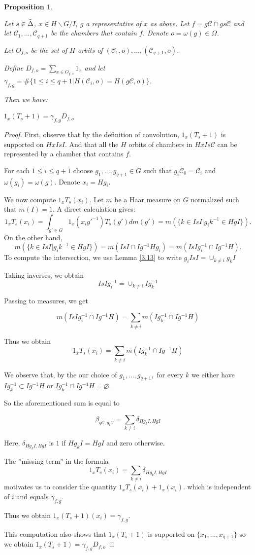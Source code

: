 \documentclass[10pt,a4paper]{amsart}
\newtheorem{prop}{Proposition}
\newcommand{\C}{\mathcal{C}}
\renewcommand{\emptyset}{\varnothing}
\begin{document}
\begin{prop}\label{key_computation}

Let $s\in \Tilde{\Delta}$, $x\in H\backslash G/I$, $g$ a representative of $x$ as above. Let $f=g\C\cap gs\C$ and let $\C_1,...,\C_{q+1}$ be the chambers that contain $f$. Denote $o=\omega(g)\in\Omega$.

Let $O_{f,o}$ be the set of $H$ orbits of $(\C_1,o),...,(\C_{q+1},o)$.

Define $D_{f,o}=\sum_{x\in O_{f,o}}1_x$ and 
let $\gamma_{f,g}=\#\{1\leq i\leq q+1|H(\C_i,o)=H(g\C,o)\}$.

Then we have:
\begin{center}
    $1_x(T_s+1)=\gamma_{f,g} D_{f,o}$
\end{center}
\end{prop}

\begin{proof}

First, observe that by the definition of convolution, $1_x(T_s+1)$ is supported on $HxIsI$. And that all the $H$ orbits of chambers in $HxIs\C$ can be represented by a chamber that contains $f$.

For each $1\leq i\leq q+1$ choose $g_1,...,g_{q+1}\in G$ such that $g_i\C_0=\C_i$ and $\omega(g_i)=\omega(g)$. Denote $x_i=Hg_i$.

We now compute $1_{x}T_s(x_i)$.
Let $m$ be a Haar measure on $G$ normalized such that $m(I)=1.$
A direct calculation gives:
$$1_{x}T_s(x_i)=\int_{g'\in G} 1_{x}(x_ig'^{-1})T_s(g')dm(g')=m(\{k\in IsI|g_ik^{-1}\in HgI\}).$$ 
On the other hand, 
$$m(\{k\in IsI|g_ik^{-1}\in HgI\})=m(IsI\cap Ig^{-1}Hg_i)=m(IsIg^{-1}_i\cap Ig^{-1}H).$$
To compute the intersection, we use Lemma \ref{3.13} to write $g_iIsI=\cup_{k\neq i}g_kI$

Taking inverses, we obtain $$IsIg^{-1}_i=\cup_{k\neq i}Ig^{-1}_k$$

Passing to measures, we get

$$m(IsIg^{-1}_i\cap Ig^{-1}H)=\sum_{k\neq i}m(Ig^{-1}_k\cap Ig^{-1}H)$$

Thus we obtain
 $$1_{x}T_s(x_i)=\sum_{k\neq i}m(Ig^{-1}_k\cap Ig^{-1}H)$$


We observe that, by the our choice of $g_{1},...,g_{q+1},$ for every $k$ we either have $Ig_k^{-1}\subset Ig^{-1}H$ or $Ig_k^{-1}\cap Ig^{-1}H=\emptyset.$

So the aforementioned sum is equal to

\[
    \beta_{g\C,g_i\C}=\sum_{k\neq i}\delta_{Hg_kI,HgI} \label{eq:special} \tag{*}
\]

Here, $\delta_{Hg_kI,HgI}$ is $1$ if $Hg_kI=HgI$ and zero otherwise.

The ''missing term'' in the formula 
$$1_{x}T_s(x_i)=\sum_{k\neq i}\delta_{Hg_kI,HgI}$$ motivates us to consider the quantity 
$1_{x}T_s(x_i)+1_{x}(x_{i}).$ which is independent of $i$ and equals $\gamma_{f,g}$.

Thus we obtain $1_x(T_s+1)(x_i)=\gamma_{f,g}$.

This computation also shows that $1_x(T_s+1)$ is supported on $\{x_1,...,x_{q+1}\}$ so we obtain $1_x(T_s+1)=\gamma_{f,g} D_{f,o}$
\end{proof}
\end{document}
